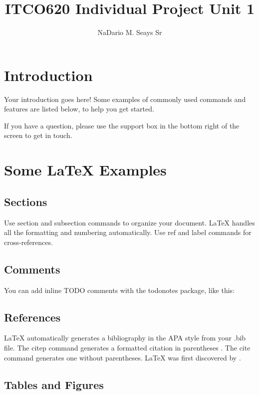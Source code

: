 \documentclass[a4paper,man, 12pt]{apa6}
\title{ITCO620 Individual Project Unit 1}
\author{NaDario M. Seays Sr}
\affiliation{American Inter-Continental University}
\begin{document}
\maketitle

\section{Introduction}

Your introduction goes here! Some examples of commonly used commands and features are listed below, to help you get started.

If you have a question, please use the support box in the bottom right of the screen to get in touch.

\section{Some \LaTeX{} Examples}
\label{sec:examples}

\subsection{Sections}

Use section and subsection commands to organize your document. \LaTeX{} handles all the formatting and numbering automatically. Use ref and label commands for cross-references.

\subsection{Comments}

You can add inline TODO comments with the todonotes package, like this:

\subsection{References}

LaTeX automatically generates a bibliography in the APA style from your .bib file. The citep command generates a formatted citation in parentheses \citep{Lamport1986}. The cite command generates one without parentheses. LaTeX was first discovered by \cite{Lamport1986}.

\subsection{Tables and Figures}
\end{document}
